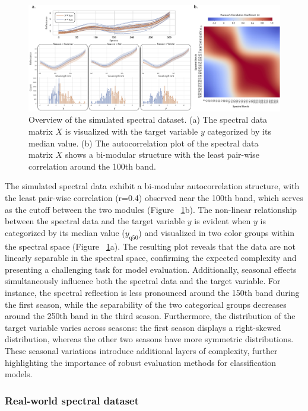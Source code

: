 \begin{figure}[H]
    \centering
    \includegraphics[width=1\textwidth]{fig_2.jpg}
    \caption{Overview of the simulated spectral dataset. (a) The spectral data matrix $X$ is visualized with the target variable $y$ categorized by its median value. (b) The autocorrelation plot of the spectral data matrix $X$ shows a bi-modular structure with the least pair-wise correlation around the 100th band.}
    \label{fig:2_sim_data}
\end{figure}

The simulated spectral data exhibit a bi-modular autocorrelation structure, with the least pair-wise correlation (r=0.4) observed near the 100th band, which serves as the cutoff between the two modules (Figure ~\ref{fig:2_sim_data}b). The non-linear relationship between the spectral data and the target variable $y$ is evident when $y$ is categorized by its median value ($y_{\text{q}50}$) and visualized in two color groups within the spectral space (Figure ~\ref{fig:2_sim_data}a). The resulting plot reveals that the data are not linearly separable in the spectral space, confirming the expected complexity and presenting a challenging task for model evaluation. Additionally, seasonal effects simultaneously influence both the spectral data and the target variable. For instance, the spectral reflection is less pronounced around the 150th band during the first season, while the separability of the two categorical groups decreases around the 250th band in the third season. Furthermore, the distribution of the target variable varies across seasons: the first season displays a right-skewed distribution, whereas the other two seasons have more symmetric distributions. These seasonal variations introduce additional layers of complexity, further highlighting the importance of robust evaluation methods for classification models.

\subsubsection{Real-world spectral dataset}

